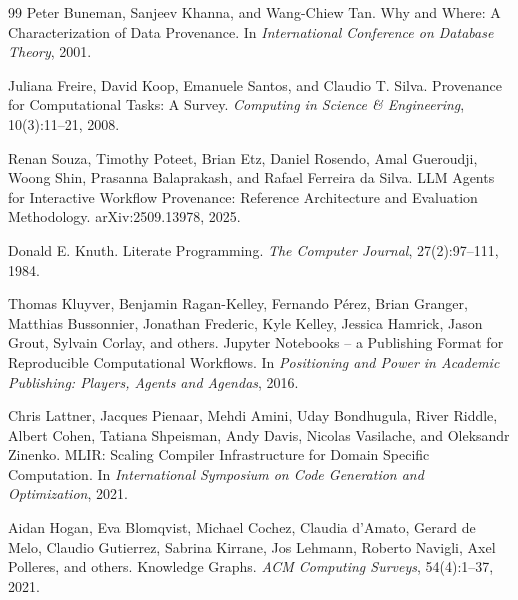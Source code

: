 \documentclass{article}
\begin{document}
\begin{thebibliography}{99}
Peter Buneman, Sanjeev Khanna, and Wang-Chiew Tan.
\newblock Why and Where: A Characterization of Data Provenance.
\newblock In \emph{International Conference on Database Theory}, 2001.

Juliana Freire, David Koop, Emanuele Santos, and Claudio T. Silva.
\newblock Provenance for Computational Tasks: A Survey.
\newblock \emph{Computing in Science \& Engineering}, 10(3):11--21, 2008.

Renan Souza, Timothy Poteet, Brian Etz, Daniel Rosendo, Amal Gueroudji, Woong Shin, Prasanna Balaprakash, and Rafael Ferreira da Silva.
\newblock LLM Agents for Interactive Workflow Provenance: Reference Architecture and Evaluation Methodology.
\newblock arXiv:2509.13978, 2025.

Donald E. Knuth.
\newblock Literate Programming.
\newblock \emph{The Computer Journal}, 27(2):97--111, 1984.

Thomas Kluyver, Benjamin Ragan-Kelley, Fernando P\'erez, Brian Granger, Matthias Bussonnier, Jonathan Frederic, Kyle Kelley, Jessica Hamrick, Jason Grout, Sylvain Corlay, and others.
\newblock Jupyter Notebooks -- a Publishing Format for Reproducible Computational Workflows.
\newblock In \emph{Positioning and Power in Academic Publishing: Players, Agents and Agendas}, 2016.

Chris Lattner, Jacques Pienaar, Mehdi Amini, Uday Bondhugula, River Riddle, Albert Cohen, Tatiana Shpeisman, Andy Davis, Nicolas Vasilache, and Oleksandr Zinenko.
\newblock MLIR: Scaling Compiler Infrastructure for Domain Specific Computation.
\newblock In \emph{International Symposium on Code Generation and Optimization}, 2021.

Aidan Hogan, Eva Blomqvist, Michael Cochez, Claudia d'Amato, Gerard de Melo, Claudio Gutierrez, Sabrina Kirrane, Jos Lehmann, Roberto Navigli, Axel Polleres, and others.
\newblock Knowledge Graphs.
\newblock \emph{ACM Computing Surveys}, 54(4):1--37, 2021.

\end{thebibliography}
\end{document}

